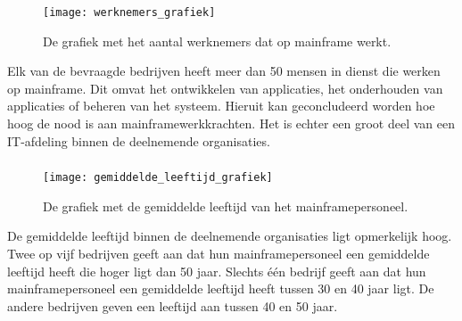  \subsubsection{}
\label{sec:Wat is het aantal van werknemers die werk leveren dat te maken heeft met het ontwikkelen, onderhouden of beheren van een mainframe?}

 \begin{figure}[h]
    \centering
    \texttt{[image: werknemers\_grafiek]}
    \caption{De grafiek met het aantal werknemers dat op mainframe werkt.}
\end{figure}

Elk van de bevraagde bedrijven heeft meer dan 50 mensen in dienst die werken op mainframe. Dit omvat het ontwikkelen van applicaties, het onderhouden van applicaties of beheren van het systeem. Hieruit kan geconcludeerd worden hoe hoog de nood is aan mainframewerkkrachten. Het is echter een groot deel van een IT-afdeling binnen de deelnemende organisaties.

\newpage

 \subsubsection{}
\label{sec:Wat is de gemiddelde leeftijd van het mainframepersoneel?}

\begin{figure}[h]
    \centering
    \texttt{[image: gemiddelde\_leeftijd\_grafiek]}
    \caption{De grafiek met de gemiddelde leeftijd van het mainframepersoneel.}
\end{figure}


De gemiddelde leeftijd binnen de deelnemende organisaties ligt opmerkelijk hoog. Twee op vijf bedrijven geeft aan dat hun mainframepersoneel een gemiddelde leeftijd heeft die hoger ligt dan 50 jaar. Slechts één bedrijf geeft aan dat hun mainframepersoneel een gemiddelde leeftijd heeft tussen 30 en 40 jaar ligt. De andere bedrijven geven een leeftijd aan tussen 40 en 50 jaar. 

\newpage 

  \subsubsection{}
 \label{sec:Zijn er opmerkelijk signalen die aangeven of er een tekort is aan nieuwe mainframe-experten?}
 
